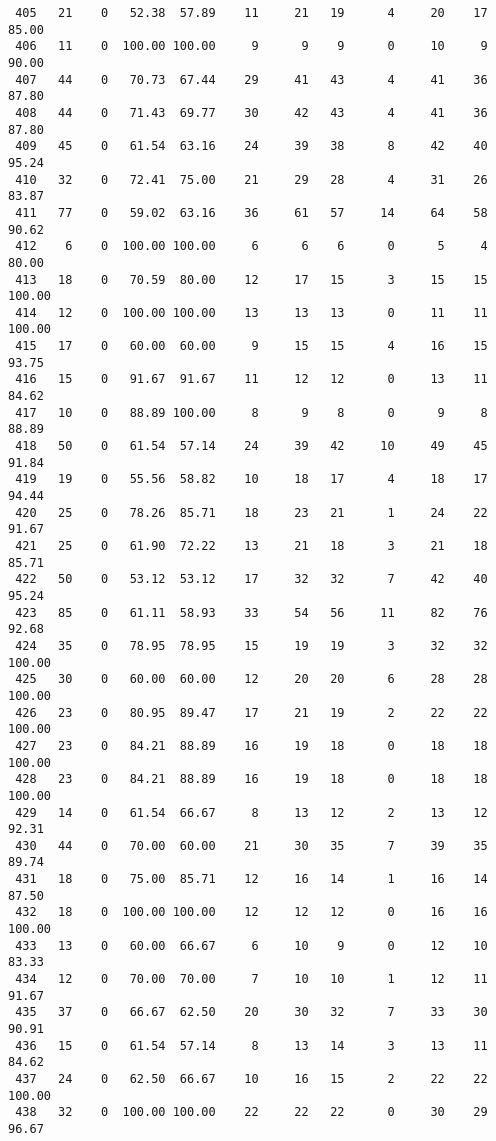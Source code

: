 \begin{verbatim}
 405   21    0   52.38  57.89    11     21   19      4     20    17    85.00
 406   11    0  100.00 100.00     9      9    9      0     10     9    90.00
 407   44    0   70.73  67.44    29     41   43      4     41    36    87.80
 408   44    0   71.43  69.77    30     42   43      4     41    36    87.80
 409   45    0   61.54  63.16    24     39   38      8     42    40    95.24
 410   32    0   72.41  75.00    21     29   28      4     31    26    83.87
 411   77    0   59.02  63.16    36     61   57     14     64    58    90.62
 412    6    0  100.00 100.00     6      6    6      0      5     4    80.00
 413   18    0   70.59  80.00    12     17   15      3     15    15   100.00
 414   12    0  100.00 100.00    13     13   13      0     11    11   100.00
 415   17    0   60.00  60.00     9     15   15      4     16    15    93.75
 416   15    0   91.67  91.67    11     12   12      0     13    11    84.62
 417   10    0   88.89 100.00     8      9    8      0      9     8    88.89
 418   50    0   61.54  57.14    24     39   42     10     49    45    91.84
 419   19    0   55.56  58.82    10     18   17      4     18    17    94.44
 420   25    0   78.26  85.71    18     23   21      1     24    22    91.67
 421   25    0   61.90  72.22    13     21   18      3     21    18    85.71
 422   50    0   53.12  53.12    17     32   32      7     42    40    95.24
 423   85    0   61.11  58.93    33     54   56     11     82    76    92.68
 424   35    0   78.95  78.95    15     19   19      3     32    32   100.00
 425   30    0   60.00  60.00    12     20   20      6     28    28   100.00
 426   23    0   80.95  89.47    17     21   19      2     22    22   100.00
 427   23    0   84.21  88.89    16     19   18      0     18    18   100.00
 428   23    0   84.21  88.89    16     19   18      0     18    18   100.00
 429   14    0   61.54  66.67     8     13   12      2     13    12    92.31
 430   44    0   70.00  60.00    21     30   35      7     39    35    89.74
 431   18    0   75.00  85.71    12     16   14      1     16    14    87.50
 432   18    0  100.00 100.00    12     12   12      0     16    16   100.00
 433   13    0   60.00  66.67     6     10    9      0     12    10    83.33
 434   12    0   70.00  70.00     7     10   10      1     12    11    91.67
 435   37    0   66.67  62.50    20     30   32      7     33    30    90.91
 436   15    0   61.54  57.14     8     13   14      3     13    11    84.62
 437   24    0   62.50  66.67    10     16   15      2     22    22   100.00
 438   32    0  100.00 100.00    22     22   22      0     30    29    96.67

\end{verbatim}
